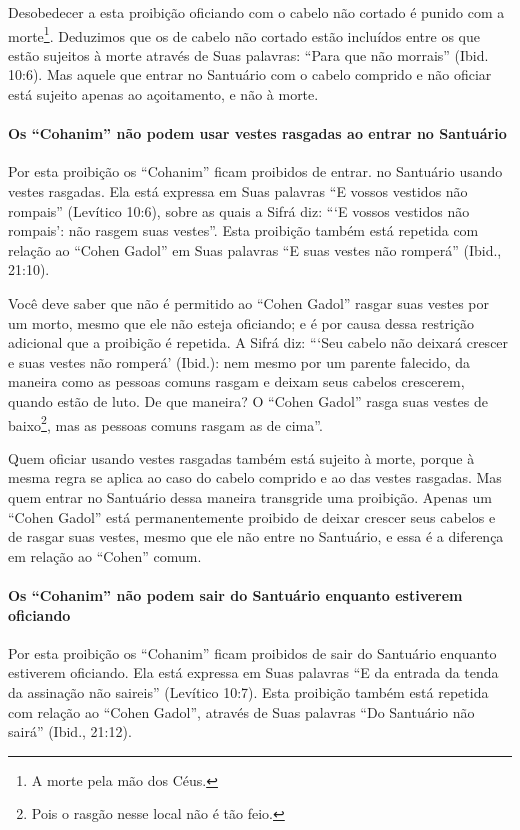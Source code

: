 Desobedecer a esta proibição oficiando com o cabelo não cortado é punido
com a morte\footnote{A morte pela mão dos Céus.}. Deduzimos que os de cabelo não
cortado estão incluídos entre os que estão sujeitos à morte através de
Suas palavras: ``Para que não morrais'' (Ibid. 10:6). Mas aquele que
entrar no Santuário com o cabelo comprido e não oficiar está sujeito
apenas ao açoitamento, e não à morte.

\paragraph{Os ``Cohanim'' não podem usar vestes rasgadas ao entrar no Santuário}

Por esta proibição os ``Cohanim'' ficam proibidos de entrar. no
Santuário usando vestes rasgadas. Ela está expressa em Suas palavras ``E
vossos vestidos não rompais'' (Levítico 10:6), sobre as quais a Sifrá
diz: ```E vossos vestidos não rompais': não rasgem suas vestes''. Esta
proibição também está repetida com relação ao ``Cohen Gadol'' em Suas
palavras ``E suas vestes não romperá'' (Ibid., 21:10).

Você deve saber que não é permitido ao ``Cohen Gadol'' rasgar suas
vestes por um morto, mesmo que ele não esteja oficiando; e é por causa
dessa restrição adicional que a proibição é repetida. A Sifrá diz:
```Seu cabelo não deixará crescer e suas vestes não romperá' (Ibid.): nem mesmo por um
parente falecido, da maneira como as pessoas comuns rasgam e deixam seus
cabelos crescerem, quando estão de luto. De que maneira? O ``Cohen
Gadol'' rasga suas vestes de baixo\footnote{Pois o rasgão nesse local não é tão feio.}, mas as pessoas
comuns rasgam as de cima''.

Quem oficiar usando vestes rasgadas também está sujeito à morte, porque
à mesma regra se aplica ao caso do cabelo comprido e ao das vestes
rasgadas. Mas quem entrar no Santuário dessa maneira transgride uma
proibição. Apenas um ``Cohen Gadol'' está permanentemente proibido de
deixar crescer seus cabelos e de rasgar suas vestes, mesmo que ele não
entre no Santuário, e essa é a diferença em relação ao ``Cohen'' comum.

\paragraph{Os ``Cohanim'' não podem sair do Santuário enquanto estiverem oficiando}

Por esta proibição os ``Cohanim'' ficam proibidos de sair do Santuário
enquanto estiverem oficiando. Ela está expressa em Suas palavras ``E da
entrada da tenda da assinação não saireis'' (Levítico 10:7). Esta
proibição também está repetida com relação ao ``Cohen Gadol'', através
de Suas palavras ``Do Santuário não sairá'' (Ibid., 21:12).

